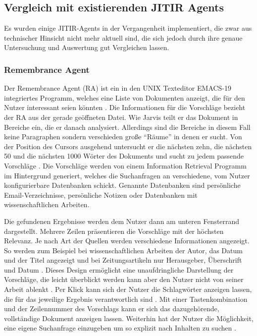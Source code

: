 \subsection{Vergleich mit existierenden JITIR Agents}
Es wurden einige JITIR-Agents in der Vergangenheit implementiert, die zwar aus technischer Hinsicht nicht mehr aktuell sind, die sich jedoch durch ihre genaue Untersuchung und Auswertung gut Vergleichen lassen.

 	\subsubsection{Remembrance Agent}
 	Der Remembrance Agent (RA) ist ein in den UNIX Texteditor EMACS-19 integriertes Programm, welches eine Liste von Dokumenten anzeigt, die für den Nutzer interessant seien könnten \cite{rhodes1996remembrance}. Die Informationen für die Vorschläge bezieht der RA aus der gerade geöffneten Datei. Wie Jarvis teilt er das Dokument in Bereiche ein, die er danach analysiert. Allerdings sind die Bereiche in diesem Fall keine Paragraphen sondern verschieden große ``Räume'' in denen er sucht. Von der Position des Cursors ausgehend untersucht er die nächsten zehn, die nächsten 50 und die nächsten 1000 Wörter des Dokuments und sucht zu jedem passende Vorschläge \cite{rhodes1996remembrance}. Die Vorschläge werden von einem Information Retrieval Programm im Hintergrund generiert, welches die Suchanfragen an verschiedene, vom Nutzer konfigurierbare Datenbanken schickt. Genannte Datenbanken sind persönliche Email-Verzeichnisse, persönliche Notizen oder Datenbanken mit wissenschaftlichen Arbeiten.

 	Die gefundenen Ergebnisse werden dem Nutzer dann am unteren Fensterrand dargestellt. Mehrere Zeilen präsentieren die Vorschläge mit der höchsten Relevanz. Je nach Art der Quellen werden verschiedene Informationen angezeigt. So werden zum Beispiel bei wissenschaftlichen Arbeiten der Autor, das Datum und der Titel angezeigt und bei Zeitungsartikeln nur Herausgeber, Überschrift und Datum \cite{rhodes2000just}. Dieses Design ermöglicht eine unaufdringliche Darstellung der Vorschläge, die leicht überblickt werden kann aber den Nutzer nicht von seiner Arbeit ablenkt \cite{rhodes1996remembrance}. Per Klick kann sich der Nutzer die Schlagwörter anzeigen lassen, die für das jeweilige Ergebnis verantwortlich sind \cite{rhodes2000just}. Mit einer Tastenkombination und der Zeilennummer des Vorschlags kann er sich das dazugehörende, vollständige Dokument anzeigen lassen. Weiterhin hat der Nutzer die Möglichkeit, eine eigene Suchanfrage einzugeben um so explizit nach Inhalten zu suchen \cite{rhodes1996remembrance}.


